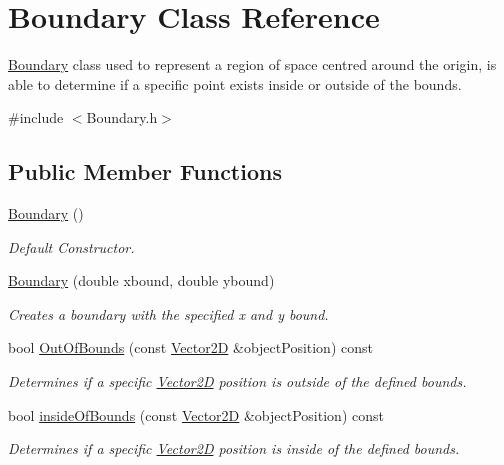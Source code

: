 \hypertarget{class_boundary}{}\section{Boundary Class Reference}
\label{class_boundary}


\hyperlink{class_boundary}{Boundary} class used to represent a region of space centred around the origin, is able to determine if a specific point exists inside or outside of the bounds.  




{\ttfamily \#include $<$Boundary.\+h$>$}

\subsection*{Public Member Functions}
\begin{DoxyCompactItemize}
\item 
\hyperlink{class_boundary_a7c4c8db45b13dab630e4c6ed7a958e71}{Boundary} ()
\begin{DoxyCompactList}\small\item\em Default Constructor. \end{DoxyCompactList}\item 
\hyperlink{class_boundary_a1ebdbcf1f4bfc6c98ec89e0f15754a59}{Boundary} (double xbound, double ybound)
\begin{DoxyCompactList}\small\item\em Creates a boundary with the specified x and y bound. \end{DoxyCompactList}\item 
bool \hyperlink{class_boundary_a92d424b11ae1362dcb0b352c9c6aaed3}{Out\+Of\+Bounds} (const \hyperlink{class_vector2_d}{Vector2D} \&object\+Position) const
\begin{DoxyCompactList}\small\item\em Determines if a specific \hyperlink{class_vector2_d}{Vector2D} position is outside of the defined bounds. \end{DoxyCompactList}\item 
bool \hyperlink{class_boundary_ae307f83cb40ccaa89e37f58d007c4e6b}{inside\+Of\+Bounds} (const \hyperlink{class_vector2_d}{Vector2D} \&object\+Position) const
\begin{DoxyCompactList}\small\item\em Determines if a specific \hyperlink{class_vector2_d}{Vector2D} position is inside of the defined bounds. \end{DoxyCompactList}\end{DoxyCompactItemize}
